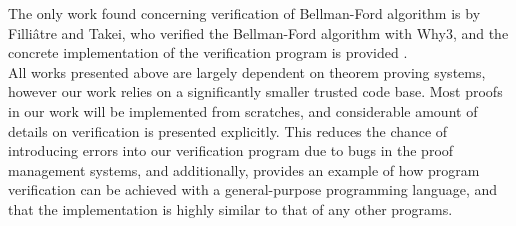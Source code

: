The only work found concerning verification of Bellman-Ford algorithm is by Filliâtre and Takei, who verified the Bellman-Ford algorithm with Why3, and the concrete implementation of the verification program is provided \cite{Jean&Takei} \cite{why3}. 
\\

All works presented above are largely dependent on theorem proving systems, however our work relies on a significantly smaller trusted code base. Most proofs in our work will be implemented from scratches, and considerable amount of details on verification is presented explicitly. This reduces the chance of introducing errors into our verification program due to bugs in the proof management systems, and additionally, provides an example of how program verification can be achieved with a general-purpose programming language, and that the implementation is highly similar to that of any other programs. 



